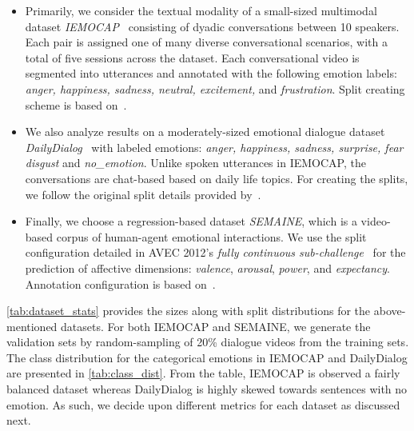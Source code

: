 \documentclass[preprint,3pt]{elsarticle}
\begin{document}
	\begin{itemize}
		\item Primarily, we consider the textual modality of a small-sized multimodal dataset \textit{IEMOCAP}~\cite{busso2008iemocap} consisting of dyadic conversations between 10 speakers. Each pair is assigned one of many diverse conversational scenarios, with a total of five sessions across the dataset. Each conversational video is segmented into utterances and annotated with the following emotion labels: \textit{anger, happiness, sadness, neutral, excitement,} and \textit{frustration}. Split creating scheme is based on~\citet{hazarika2018icon}.
		\item We also analyze results on a moderately-sized emotional dialogue dataset \textit{DailyDialog}~\cite{li2017dailydialog} with labeled emotions: \textit{anger, happiness, sadness, surprise, fear disgust} and \textit{no\_emotion}. Unlike spoken utterances in IEMOCAP, the conversations are chat-based based on daily life topics. For creating the splits, we follow the original split details provided by~\citet{li2017dailydialog}.
		\item Finally, we choose a regression-based dataset \textit{SEMAINE}, which is a video-based corpus of human-agent emotional interactions. We use the split configuration detailed in AVEC 2012's \textit{fully continuous sub-challenge}~\cite{schuller2012avec} for the prediction of affective dimensions: \textit{valence}, \textit{arousal}, \textit{power}, and \textit{expectancy}. Annotation configuration is based on~\citet{hazarika2018icon}.
	\end{itemize}
	
	\cref{tab:dataset_stats} provides the sizes along with split distributions for the above-mentioned datasets. For both IEMOCAP and SEMAINE, we generate the validation sets by random-sampling of 20\% dialogue videos from the training sets. The class distribution for the categorical emotions in IEMOCAP and DailyDialog are presented in \cref{tab:class_dist}. From the table, IEMOCAP is observed a fairly balanced dataset whereas DailyDialog is highly skewed towards sentences with no emotion. As such, we decide upon different metrics for each dataset as discussed next.
\end{document}
